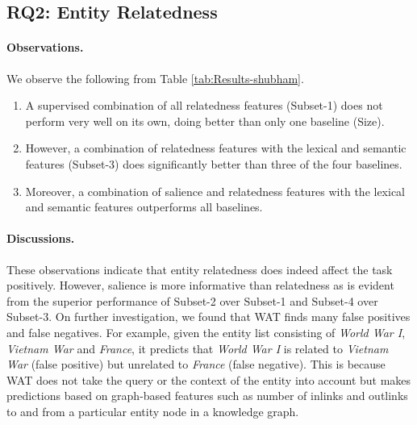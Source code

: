 

\subsection{RQ2: Entity Relatedness}
\label{subsec:Entity Relatedness}

\paragraph{\textbf{Observations.}}
We observe the following from Table \ref{tab:Results-shubham}.
\begin{enumerate}
    \item A supervised combination of all relatedness features (Subset-1) does not perform very well on its own, doing better than only one baseline (Size).
    \item However, a combination of relatedness features with the lexical and semantic features (Subset-3) does significantly better than three of the four baselines.
    \item Moreover, a combination of salience and relatedness features with the lexical and semantic features outperforms all baselines. 
\end{enumerate}



\paragraph{\textbf{Discussions.}}
These observations indicate that entity relatedness does indeed affect the task positively. However, salience is more informative than relatedness as is evident from the superior performance of Subset-2 over Subset-1 and Subset-4 over Subset-3. On further investigation, we found that WAT finds many false positives and false negatives. For example, given the entity list consisting of  \textit{World War I}, \textit{Vietnam War} and \textit{France}, it predicts that \textit{World War I} is related to \textit{Vietnam War} (false positive) but  unrelated to \textit{France} (false negative). This is because WAT does not take
the query or the context of the entity into account but makes predictions based on  graph-based features such as number of inlinks and outlinks to and from a particular entity node in a knowledge graph. 

